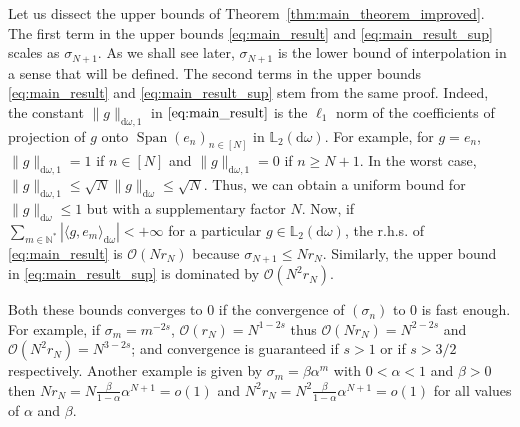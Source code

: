 \documentclass[twoside,11pt]{book}
\numberwithin{theorem}{chapter}
\numberwithin{definition}{chapter}
\numberwithin{proposition}{chapter}
\numberwithin{corollary}{chapter}
\numberwithin{example}{chapter}
\numberwithin{lemma}{chapter}
\DeclareMathOperator{\Span}{\mathrm{Span}}
\begin{document}
Let us dissect the upper bounds of Theorem~\ref{thm:main_theorem_improved}. The first term in the upper bounds \eqref{eq:main_result} and \eqref{eq:main_result_sup} scales as $\sigma_{N+1}$. As we shall see later, $\sigma_{N+1}$ is the lower bound of interpolation in a sense that will be defined. The second terms in the upper bounds \eqref{eq:main_result} and \eqref{eq:main_result_sup} stem from the same proof. Indeed, the constant $\|g\|_{\mathrm{d}\omega,1}$ in $\eqref{eq:main_result}$ is the $\ell_1$ norm of the coefficients of projection of $g$ onto $\Span(e_{n})_{n \in [N]}$ in $\mathbb{L}_{2}(\mathrm{d}\omega)$. For example, for $g = e_{n}$, $\|g\|_{\mathrm{d}\omega,1} = 1$ if $n \in [N]$ and $\|g\|_{\mathrm{d}\omega,1} = 0$ if $n \geq N+1$. In the worst case, $\|g\|_{\mathrm{d}\omega,1} \leq \sqrt{N} \|g\|_{\mathrm{d}\omega} \leq \sqrt{N}$.
Thus, we can obtain a uniform bound for $\|g\|_{\mathrm{d}\omega}\leq 1$ but with a supplementary factor $N$. Now, if $\sum\limits_{m \in \mathbb{N}^{*}} |\langle g,e_{m} \rangle_{\mathrm{d}\omega}| < +\infty$ for a particular $g \in \mathbb{L}_{2}(\mathrm{d}\omega)$, the r.h.s. of \eqref{eq:main_result} is $\mathcal{O}(Nr_{N})$ because $\sigma_{N+1} \leq Nr_{N}$. Similarly, the upper bound in \eqref{eq:main_result_sup} is dominated by $\mathcal{O}(N^{2}r_{N})$.

Both these bounds converges to $0$ if the convergence of $(\sigma_{n})$ to $0$ is fast enough. For example, if $\sigma_{m} = m^{-2s}$, $\mathcal{O}(r_{N}) = N^{1-2s}$ thus $\mathcal{O}(Nr_{N}) = N^{2-2s}$ and $\mathcal{O}(N^{2}r_{N}) = N^{3-2s}$; and convergence is guaranteed if $s >1$ or if $s>3/2$ respectively. Another example is given by $\sigma_{m} = \beta \alpha^{m}$ with $0 < \alpha < 1$ and $\beta >0$ then $Nr_{N} = N\frac{\beta}{1-\alpha}\alpha^{N+1}=  o(1)$ and $N^{2}r_{N} = N^{2}\frac{\beta}{1-\alpha}\alpha^{N+1}=  o(1)$ for all values of $\alpha$ and $\beta$.



\end{document}
